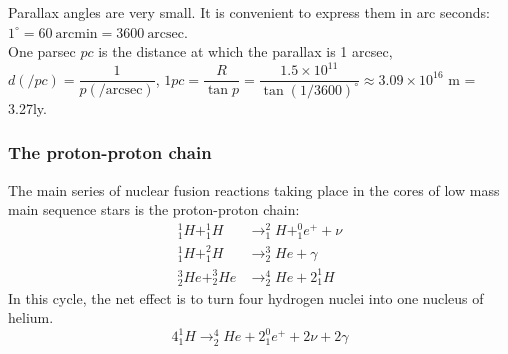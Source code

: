 \documentclass[a4paper,12pt]{article}
\begin{document}
\begin{center}
\end{center}
Parallax angles are very small. It is convenient to express them in arc seconds: $1^\circ=60\ \text{arcmin}=3600\ \text{arcsec}$.\\
One parsec $pc$ is the distance at which the parallax is 1 arcsec, $d(/pc)=\dfrac{1}{p(/\text{arcsec})}$, $1pc=\dfrac{R}{\tan p}=\dfrac{1.5\times 10^{11}}{\tan (1/3600)^\circ}\approx3.09\times 10^{16}$ m = 3.27ly.
\subsubsection*{The proton-proton chain}
The main series of nuclear fusion reactions taking place in the cores of low mass main sequence stars is the proton-proton chain:
\[
\begin{aligned}
  ^1_1H+^1_1H&\rightarrow ^2_1H+^0_1e^++\nu\\
  ^1_1H+^2_1H&\rightarrow ^3_2He+\gamma\\
  ^3_2He+^3_2He&\rightarrow ^4_2He+2^1_1H
\end{aligned}\]
In this cycle, the net effect is to turn four hydrogen nuclei into one nucleus of helium. 
\[4^1_1H\rightarrow ^4_2He+2^0_1e^++2\nu +2\gamma\]
\end{document}
